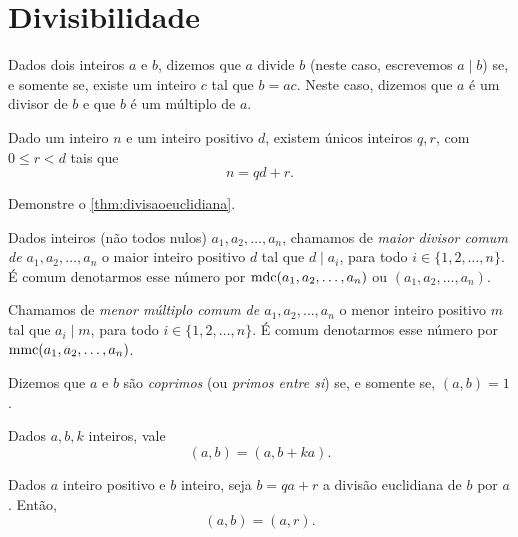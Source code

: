 \documentclass[10pt, a4paper]{report}
\begin{document}
	\tableofcontents

	\chapter{Divisibilidade}

	\begin{defn}[Divisibilidade]
		Dados dois inteiros $a$ e $b$, dizemos que $a$ divide $b$ (neste caso, escrevemos $a \mid b$) se, e somente se, existe um inteiro $c$ tal que $b = ac$. Neste caso, dizemos que $a$ é um divisor de $b$ e que $b$ é um múltiplo de $a$.
	\end{defn}

	\begin{thm}\label{thm:divisaoeuclidiana}
		Dado um inteiro $n$ e um inteiro positivo $d$, existem únicos inteiros $q, r$, com $0 \le r < d$ tais que  \[
			n = qd + r.
		\]
	\end{thm}

	\begin{exer}
		Demonstre o \cref{thm:divisaoeuclidiana}.
	\end{exer}

	\begin{defn}
		Dados inteiros (não todos nulos) $a_1, a_2, \dots, a_n$, chamamos de \emph{maior divisor comum de $a_1, a_2, \dots, a_n$} o maior inteiro positivo $d$ tal que $d \mid a_i$, para todo $i \in \{1, 2, \dots, n\}$.
		É comum denotarmos esse número por $\operatorname{mdc}(a_1, a_2, \dots, a_n)$ ou $(a_1, a_2, \dots, a_n)$.

		Chamamos de \emph{menor múltiplo comum de $a_1, a_2, \dots, a_n$} o menor inteiro positivo $m$ tal que $a_i \mid m$, para todo $i \in \{1, 2, \dots, n\}$. É comum denotarmos esse número por $\operatorname{mmc}(a_1, a_2, \dots, a_n)$.
	\end{defn}

	\begin{defn}[Coprimos]
		Dizemos que $a$ e $b$ são \emph{coprimos} (ou \emph{primos entre si}) se, e somente se, $(a, b) = 1$.
	\end{defn}

	\begin{thm}\label{thm:util}
		Dados $a, b, k$ inteiros, vale \[
			(a, b) = (a, b + ka).
		\]
	\end{thm}

	\begin{cor}
		Dados $a$ inteiro positivo e $b$ inteiro, seja $b = qa + r$ a divisão euclidiana de $b$ por $a$. Então, \[
			(a, b) = (a, r).
		\]
	\end{cor}
\end{document}
